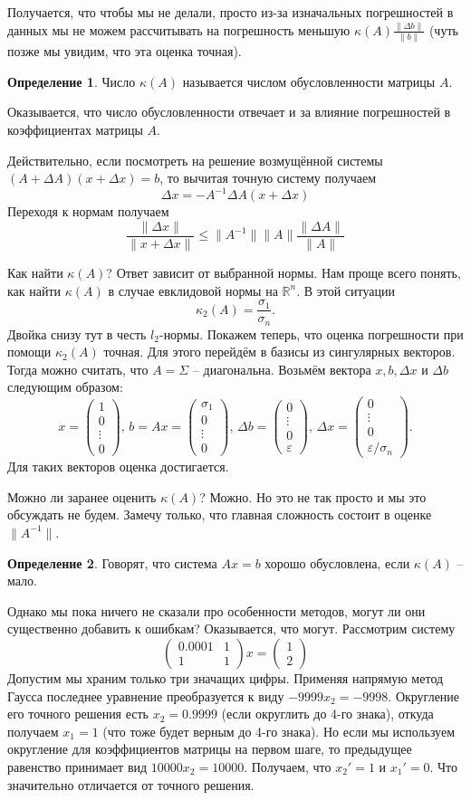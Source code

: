 \documentclass[10pt,a4paper,oneside]{book}
\theoremstyle{definition}
\newtheorem*{defn}{\color{yellow!30!red} Определение}
\renewcommand{\leq}{\leqslant}
\newcommand{\mb}[1]{\mathbb{#1}}
\def\eps{\varepsilon}
\def\dfn{\begin{defn}}
\def\edfn{\end{defn}}
\def\pmat{\begin{pmatrix}}
\def\epmat{\end{pmatrix}}
\begin{document}
Получается, что чтобы мы не делали, просто из-за изначальных погрешностей в данных мы не можем рассчитывать  на погрешность меньшую $\kappa(A)\frac{\|\Delta b\|}{\|b\|}$
(чуть позже мы увидим, что эта оценка точная). 

\dfn Число $\kappa(A)$ называется числом обусловленности матрицы $A$.
\edfn

Оказывается, что число обусловленности отвечает и за влияние погрешностей в коэффициентах матрицы $A$.

Действительно, если посмотреть на решение возмущённой системы $(A+\Delta A)(x+\Delta x)=b$, то вычитая точную систему получаем
$$\Delta x= -A^{-1}\Delta A (x+\Delta x)$$
Переходя к нормам получаем
$$\frac{\|\Delta x\|}{\|x+\Delta x\|}\leq \|A^{-1}\| \|A\| \frac{\|\Delta A\|}{\|A\|}$$

Как найти $\kappa(A)$? Ответ зависит от выбранной нормы. Нам проще всего понять, как найти $\kappa(A)$ в случае евклидовой нормы на $\mb R^n$. В этой ситуации $$\kappa_2(A)=\frac{\sigma_1}{\sigma_n}.$$
Двойка снизу тут в честь $l_2$-нормы.
Покажем теперь, что оценка погрешности при помощи $\kappa_2(A)$ точная. Для этого перейдём в базисы из сингулярных векторов. Тогда можно считать, что $A=\Sigma$ -- диагональна. Возьмём вектора $x,b,\Delta x$ и $\Delta b$ следующим образом:
$$x=\pmat 1 \\ 0\\ \vdots \\ 0 \epmat,\, b=Ax=\pmat \sigma_1 \\ 0\\ \vdots \\ 0 \epmat, \, \Delta b = \pmat 0 \\ \vdots \\ 0 \\ \eps \epmat, \, \Delta x=  \pmat 0 \\  \vdots \\ 0 \\ \eps/\sigma_n\epmat.$$
Для таких векторов оценка достигается.

Можно ли заранее оценить $\kappa(A)$? Можно. Но это не так просто и мы это обсуждать не будем. Замечу только, что главная сложность состоит в оценке $\|A^{-1}\|$.

\dfn
Говорят, что система $Ax=b$ хорошо обусловлена, если $\kappa(A)$ -- мало.
\edfn

Однако мы пока ничего не сказали про особенности методов, могут ли они существенно добавить к ошибкам? Оказывается, что могут. Рассмотрим систему 
$$\pmat 0.0001 & 1 \\ 1 & 1 \epmat x= \pmat 1 \\ 2 \epmat $$
Допустим мы храним только три значащих цифры. Применяя напрямую метод Гаусса последнее уравнение преобразуется к виду $-9999 x_2=-9998 $. Округление его точного решения есть $x_2=0.9999$ (если округлить до 4-го знака), откуда получаем $x_1=1$ (что тоже будет верным до 4-го знака). Но если мы используем округление для коэффициентов матрицы на первом шаге, то предыдущее равенство принимает вид $10000x_2 = 10000$. Получаем, что $x_2'=1$ и $x_1'=0$. Что значительно отличается от точного решения.
\end{document}
